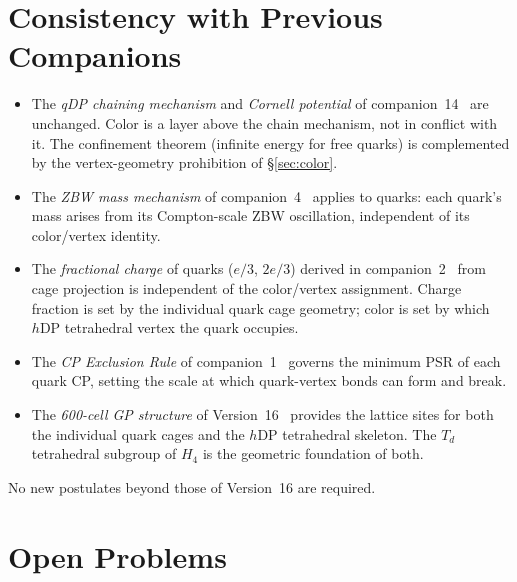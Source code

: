 \documentclass[12pt]{article}
\newcommand{\hDP}{h\mathrm{DP}}
\begin{document}
\section{Consistency with Previous Companions}
\label{sec:consistency}

\begin{itemize}[noitemsep]
\item The \emph{qDP chaining mechanism} and \emph{Cornell potential}
  of companion~14~\cite{c14} are unchanged.  Color is a layer above
  the chain mechanism, not in conflict with it.  The confinement
  theorem (infinite energy for free quarks) is complemented by the
  vertex-geometry prohibition of §\ref{sec:color}.
\item The \emph{ZBW mass mechanism} of companion~4~\cite{c4} applies
  to quarks: each quark's mass arises from its Compton-scale ZBW
  oscillation, independent of its color/vertex identity.
\item The \emph{fractional charge} of quarks ($e/3$, $2e/3$) derived
  in companion~2~\cite{c2} from cage projection is independent of
  the color/vertex assignment.  Charge fraction is set by the
  individual quark cage geometry; color is set by which
  $\hDP$ tetrahedral vertex the quark occupies.
\item The \emph{CP Exclusion Rule} of companion~1~\cite{c1} governs
  the minimum PSR of each quark CP, setting the scale at which
  quark-vertex bonds can form and break.
\item The \emph{600-cell GP structure} of Version~16~\cite{v16}
  provides the lattice sites for both the individual quark cages
  and the $\hDP$ tetrahedral skeleton.  The $T_d$ tetrahedral
  subgroup of $H_4$ is the geometric foundation of both.
\end{itemize}

No new postulates beyond those of Version~16 are required.

\section{Open Problems}
\label{sec:open}
\end{document}
